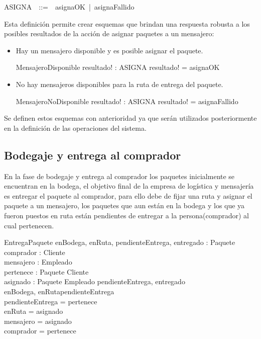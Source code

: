 \documentclass[12pt,a4paper]{article}
\begin{document}
\begin{zed}
ASIGNA~~::=~~asignaOK~|~asignaFallido
\end{zed}

Esta definición permite crear esquemas que brindan una respuesta robusta a los posibles resultados de la acción de asignar paquetes a un mensajero:
\begin{itemize}
\item Hay un mensajero disponible y es posible asignar el paquete.
\begin{schema}{MensajeroDisponible}
resultado! : ASIGNA
\where
resultado! = asignaOK
\end{schema}

\item No hay mensajeros disponibles para la ruta de entrega del paquete.
\begin{schema}{MensajeroNoDisponible}
resultado! : ASIGNA
\where
resultado! = asignaFallido
\end{schema}
\end{itemize} 

Se definen estos esquemas con anterioridad ya que serán utilizados posteriormente en la definición de las operaciones del sistema.

\subsection{Bodegaje y entrega al comprador}

En la fase de bodegaje y entrega al comprador los paquetes inicialmente se encuentran en la bodega, el objetivo final de la empresa de logística y mensajería es entregar el paquete al comprador, para ello debe de fijar una ruta y asignar el paquete a un mensajero, los paquetes que aun están en la bodega y los que ya fueron puestos en ruta están pendientes de entregar a la persona(comprador) al cual pertenecen.

\begin{schema}{EntregaPaquete}
enBodega, enRuta, pendienteEntrega, entregado : \power Paquete\\
comprador : \power Cliente\\ 
mensajero : \power Empleado\\
pertenece : Paquete \pfun Cliente\\
asignado : Paquete \pfun Empleado
\where
\disjoint \langle pendienteEntrega, entregado \rangle\\
\langle enBodega, enRuta\rangle \partition pendienteEntrega \\
pendienteEntrega = \dom pertenece \\
enRuta = \dom asignado\\
mensajero = \ran asignado\\
comprador = \ran pertenece
\end{schema}
\end{document}
